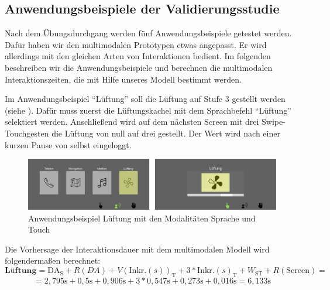 \subsection[Anwendungsbeispiele]{Anwendungsbeispiele der Validierungsstudie}
Nach dem Übungsdurchgang werden fünf Anwendungsbeispiele getestet werden. 
Dafür haben wir den multimodalen Prototypen etwas angepasst. 
Er wird allerdings mit den gleichen Arten von Interaktionen bedient. 
Im folgenden beschreiben wir die Anwendungsbeispiele und berechnen die multimodalen Interaktionszeiten, die mit Hilfe unseres Modell bestimmt werden.
 
Im Anwendungsbeispiel "`Lüftung"' soll die Lüftung auf Stufe 3 gestellt werden (siehe ). 
Dafür muss zuerst die Lüftungskachel mit dem Sprachbefehl "`Lüftung"' selektiert werden. 
Anschließend wird auf dem nächsten Screen mit drei Swipe-Touchgesten die Lüftung von null auf drei gestellt. 
Der Wert wird nach einer kurzen Pause von selbst eingeloggt.  
\begin{figure}
	\centering
		\includegraphics[width=1\textwidth]{img/UseCases_Eval_Luft.jpg}
	\caption[]{Anwendungsbeispiel Lüftung mit den Modalitäten Sprache und Touch}
	\label{fig:UseCasesEvalLuft}
\end{figure}
Die Vorhersage der Interaktionsdauer mit dem multimodalen Modell wird folgendermaßen berechnet:
\[
\textbf{Lüftung} = \text{DA}_\text{S} + R(DA) + V(\text{Inkr.} (s))_\text{T} + 3*\text{Inkr.} (s)_\text{T}  + W_\text{ST} + R(\text{Screen}) =
\]
\[
= 2,795\text{s} + 0,5\text{s} + 0,906\text{s} + 3*0,547\text{s} +  0,273\text{s} + 0,016\text{s} = 6,133\text{s}
\]

